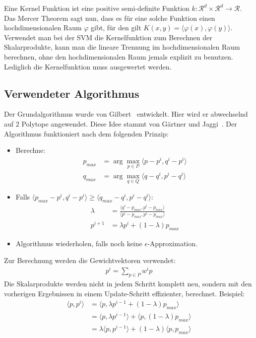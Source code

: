 \documentclass[ngerman]{scrartcl}
\begin{document}
Eine Kernel Funktion ist eine positive semi-definite Funktion $k: \mathcal R^d \times \mathcal R^d \rightarrow \mathcal R$.
Das Mercer Theorem sagt nun, dass es für eine solche Funktion einen hochdimensionalen Raum $\varphi$ gibt, für den gilt $K(x,y) = \langle \varphi(x), \varphi(y) \rangle$.
Verwendet man bei der SVM die Kernelfunktion zum Berechnen der Skalarprodukte, kann man die lineare Trennung im hochdimensionalen Raum berechnen, ohne den hochdimensionalen Raum jemals explizit zu benutzen.  Lediglich die Kernelfunktion muss ausgewertet werden.

\subsection{Verwendeter Algorithmus}
Der Grundalgorithmus wurde von Gilbert~\cite{eggilbert} entwickelt. 
Hier wird er abwechselnd auf 2 Polytope angewendet. 
Diese Idee stammt von Gärtner und Jaggi~\cite{jaggi}.
Der Algorithmus funktioniert nach dem folgenden Prinzip:
\begin{itemize}
\item Berechne:
\begin{align}
p_{max} &=\arg\max_{p \in P} \langle p - p^i, q^i - p^i \rangle \\
q_{max} &=\arg\max_{q \in Q} \langle q - q^i, p^i - q^i \rangle
\end{align}
\item Falls $ \langle p_{max} - p^i, q^i - p^i \rangle \geq \langle q_{max} - q^i, p^i - q^i \rangle$:
\begin{align}
\lambda&= \frac{\langle q^i-p_{max},p^i-p_{max}\rangle}{\langle p^i-p_{max},p^i-p_{max}\rangle}\\  
p^{i+1} &= \lambda p^i + (1 - \lambda) p_{max}
\end{align}
\item Algorithmus wiederholen, falls noch keine $\epsilon$-Approximation.
\end{itemize}
Zur Berechnung werden die Gewichtvektoren verwendet:
\begin{align}
p^i = \sum_{p \in P} w^i p
\end{align}
Die Skalarprodukte werden nicht in jedem Schritt komplett neu, sondern mit den vorherigen Ergebnissen in einem Update-Schritt effizienter, berechnet.
Beispiel:
\begin{align}
\langle p , p^i \rangle &= \langle p , \lambda p^{i-1} + (1-\lambda) p_{max} \rangle \\
&= \langle p, \lambda p^{i-1} \rangle + \langle p, (1-\lambda) p_{max} \rangle \\
&= \lambda \langle p, p^{i-1} \rangle + (1-\lambda) \langle p, p_{max} \rangle 
\end{align}
\end{document}
